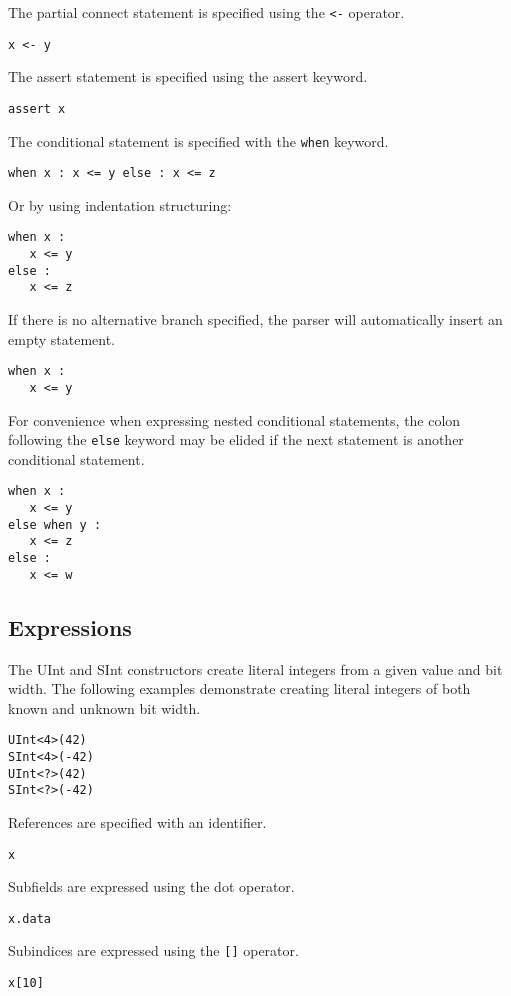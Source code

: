 \documentclass[12pt]{article}
\begin{document}
The partial connect statement is specified using the \verb|<-| operator.
\begin{verbatim}
x <- y 
\end{verbatim}

The assert statement is specified using the assert keyword.
\begin{verbatim}
assert x
\end{verbatim}

The conditional statement is specified with the \verb|when| keyword.
\begin{verbatim}
when x : x <= y else : x <= z
\end{verbatim}
Or by using indentation structuring:
\begin{verbatim}
when x :
   x <= y
else :
   x <= z
\end{verbatim}

If there is no alternative branch specified, the parser will automatically insert an empty statement.
\begin{verbatim}
when x :
   x <= y
\end{verbatim}

For convenience when expressing nested conditional statements, the colon following the \verb|else| keyword may be elided if the next statement is another conditional statement.
\begin{verbatim}
when x :
   x <= y
else when y :
   x <= z
else :
   x <= w
\end{verbatim}

\subsection*{Expressions}

The UInt and SInt constructors create literal integers from a given value and bit width.
The following examples demonstrate creating literal integers of both known and unknown bit width.
\begin{verbatim}
UInt<4>(42)
SInt<4>(-42)
UInt<?>(42)
SInt<?>(-42)
\end{verbatim}

References are specified with an identifier.
\begin{verbatim}
x
\end{verbatim}

Subfields are expressed using the dot operator.
\begin{verbatim}
x.data
\end{verbatim}

Subindices are expressed using the \verb|[]| operator.
\begin{verbatim}
x[10]
\end{verbatim}
\end{document}
